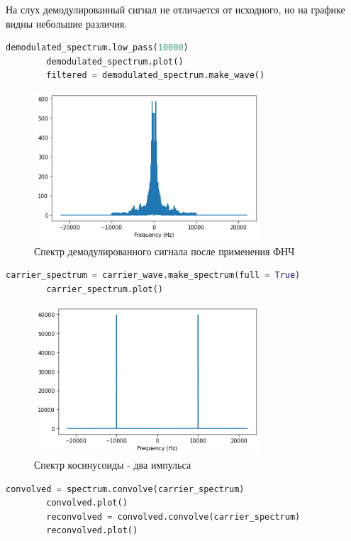 \documentclass[a4paper, 12pt]{report}
\begin{document}
	На слух демодулированный сигнал не отличается от исходного, но на графике видны небольшие различия.
	\begin{lstlisting}[language=Python,caption=Применим ФНЧ]
		demodulated_spectrum.low_pass(10000)
		demodulated_spectrum.plot()
		filtered = demodulated_spectrum.make_wave()
	\end{lstlisting}
	\begin{figure}[H]
		\centering
		\includegraphics[width=0.75\textwidth]{am6.png}
		\caption{Спектр демодулированного сигнала после применения ФНЧ}
		\label{fig:am6}
	\end{figure}
	\begin{lstlisting}[language=Python,caption=Спектр косинусоиды]
		carrier_spectrum = carrier_wave.make_spectrum(full = True)
		carrier_spectrum.plot()
	\end{lstlisting}
	\begin{figure}[H]
		\centering
		\includegraphics[width=0.75\textwidth]{am7.png}
		\caption{Спектр косинусоиды - два импульса}
		\label{fig:am7}
	\end{figure}
	\begin{lstlisting}[language=Python,caption=Два раза применим свертку сигнала с импульсами]
		convolved = spectrum.convolve(carrier_spectrum)
		convolved.plot()
		reconvolved = convolved.convolve(carrier_spectrum)
		reconvolved.plot()
	\end{lstlisting}
\end{document}
